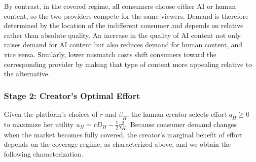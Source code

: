 By contrast, in the covered regime, all consumers choose either AI or human content, so the two providers compete for the same viewers. Demand is therefore determined by the location of the indifferent consumer and depends on relative rather than absolute quality. An increase in the quality of AI content not only raises demand for AI content but also reduces demand for human content, and vice versa. Similarly, lower mismatch costs shift consumers toward the corresponding provider by making that type of content more appealing relative to the alternative.





\subsubsection*{Stage 2: Creator's Optimal Effort}

Given the platform's choices of $r$ and $\beta_H$, the human creator selects effort $q_H \ge 0$ to maximize her utility $u_H = r D_H - \frac{1}{2} q_H^2$. Because consumer demand changes when the market becomes fully covered, the creator's marginal benefit of effort depends on the coverage regime, as characterized above, and we obtain the following characterization. 

